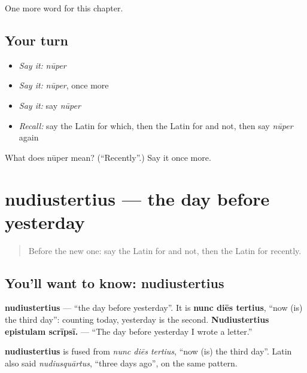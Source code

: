 \begin{grammarlens}[title={What you've built}]
One more word for this chapter.
\end{grammarlens}

\subsection*{Your turn}
\begin{itemize}
\raggedright
  \item \emph{Say it:} \emph{nūper}
  \item \emph{Say it:} \emph{nūper}, once more
  \item \emph{Say it:} say \emph{nūper}
  \item \emph{Recall:} say the Latin for which, then the Latin for and not, then say \emph{nūper} again
\end{itemize}

\begin{tcolorbox}[breakable,colback=teal!4,colframe=teal!35!black,title={Before you move on}]
What does nūper mean? (\textquotedblleft{}Recently\textquotedblright{}.) Say it once more.
\end{tcolorbox}
\section[nudiustertius]{nudiustertius — the day before yesterday}

\label{lesson:LA-C162-nudiustertius}



\begin{quote}
Before the new one: say the Latin for and not, then the Latin for recently.
\end{quote}

\subsection*{You'll want to know: nudiustertius}
\textbf{nudiustertius} — \textquotedblleft{}the day before yesterday\textquotedblright{}. It is \textbf{nunc diēs tertius}, \textquotedblleft{}now (is) the third day\textquotedblright{}: counting today, yesterday is the second. \textbf{Nudiustertius epistulam scrīpsī.} — \textquotedblleft{}The day before yesterday I wrote a letter.\textquotedblright{}

\begin{cousinweb}
\textbf{nudiustertius} is fused from \emph{nunc diēs tertius}, \textquotedblleft{}now (is) the third day\textquotedblright{}. Latin also said \emph{nudiusquārtus}, \textquotedblleft{}three days ago\textquotedblright{}, on the same pattern.
\end{cousinweb}

